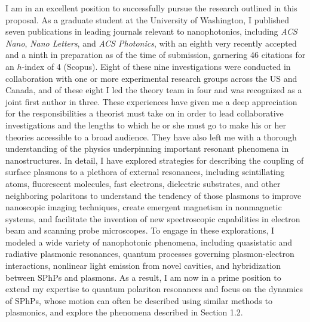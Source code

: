 \documentclass[11pt,a4paper]{article}
\begin{document}
I am in an excellent position to successfully pursue the research outlined in this proposal. As a graduate student at the University of Washington, I published seven publications in leading journals relevant to nanophotonics, including \textit{ACS Nano}, \textit{Nano Letters}, and \textit{ACS Photonics}, with an eighth very recently accepted and a ninth in preparation as of the time of submission, garnering 46 citations for an $h$-index of 4 (Scopus). Eight of these nine investigations were conducted in collaboration with one or more experimental research groups across the US and Canada, and of these eight I led the theory team in four and was recognized as a joint first author in three. These experiences have given me a deep appreciation for the responsibilities a theorist must take on in order to lead collaborative investigations and the lengths to which he or she must go to make his or her theories accessible to a broad audience. They have also left me with a thorough understanding of the physics underpinning important resonant phenomena in nanostructures. In detail, I have explored strategies for describing the coupling of surface plasmons to a plethora of external resonances, including scintillating atoms, fluorescent molecules, fast electrons, dielectric substrates, and other neighboring polaritons to understand the tendency of those plasmons to improve nanoscopic imaging techniques, create emergent magnetism in nonmagnetic systems, and facilitate the invention of new spectroscopic capabilities in electron beam and scanning probe microscopes. To engage in these explorations, I modeled a wide variety of nanophotonic phenomena, including quasistatic and radiative plasmonic resonances, quantum processes governing plasmon-electron interactions,\supercite{liu_continuous_2019} nonlinear light emission from novel cavities, and hybridization between SPhPs and plasmons.\supercite{liberko_probing_2021} As a result, I am now in a prime position to extend my expertise to quantum polariton resonances and focus on the dynamics of SPhPs, whose motion can often be described using similar methods to plasmonics, and explore the phenomena described in Section 1.2.





\end{document}
